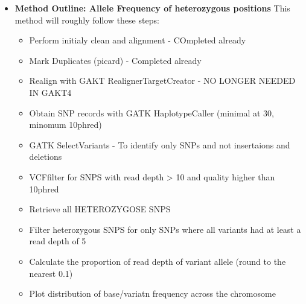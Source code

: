 \documentclass{article}
\begin{document}
\begin{itemize}
        The plan now will roughly follow these two methods:
        \begin{itemize}
            \item Allele frequency of heterozygous positions
            \item Read Depth Coverage (RDC)
        \end{itemize}

        \item \textbf{Method Outline: Allele Frequency of heterozygous positions}  This method will roughly follow these steps:
        \begin{itemize}
            \item Perform initialy clean and alignment - COmpleted already
            \item Mark Duplicates (picard) - Completed already

            \item Realign with GAKT RealignerTargetCreator - NO LONGER NEEDED IN GAKT4

            \item Obtain SNP records with GATK HaplotypeCaller (minimal at 30, minomum 10phred)
            \item GATK SelectVariants - To identify only SNPs and not insertaions and deletions
            \item VCFfilter for SNPS with read depth > 10 and quality higher than 10phred
            \item Retrieve all HETEROZYGOSE SNPS
            \item Filter heterozygous SNPS for only SNPs where all variants had at least a read depth of 5
            \item Calculate the proportion of read depth of variant allele (round to the nearest 0.1)
            \item Plot distribution of base/variatn frequency across the chromosome
        \end{itemize}
        

\end{itemize}
\end{document}
